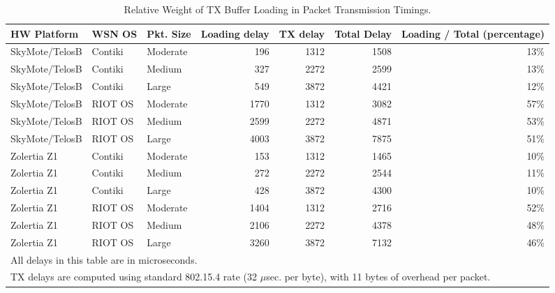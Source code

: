 \documentclass[10pt,emptycopyrightspace]{ewsn-proc}
\begin{document}
\begin{table*}[htbp]
\caption{Relative Weight of TX Buffer Loading in Packet Transmission Timings.}
\label{TblTXRelWeight}
\centering

\begin{tabular}{l|l|l|r|r|r|r}
\hline
HW Platform & WSN OS  & Pkt. Size
                  & Loading delay & TX delay & Total Delay
                  & Loading / Total (percentage) \\
\hline
SkyMote/TelosB    & Contiki & Moderate
                  &   196      & 1312     & 1508
                  & 13\% \\
SkyMote/TelosB    & Contiki & Medium
                  &   327      & 2272     & 2599
                  & 13\% \\
SkyMote/TelosB    & Contiki & Large
                  &   549      & 3872     & 4421
                  & 12\% \\
\hline
SkyMote/TelosB    & RIOT OS & Moderate
                  &  1770      & 1312     & 3082
                  & 57\% \\
SkyMote/TelosB    & RIOT OS & Medium
                  &  2599      & 2272     & 4871
                  & 53\% \\
SkyMote/TelosB    & RIOT OS & Large
                  &  4003      & 3872     & 7875
                  & 51\% \\
\hline
Zolertia Z1       & Contiki & Moderate
                  &   153      & 1312     & 1465
                  & 10\% \\
Zolertia Z1       & Contiki & Medium
                  &   272      & 2272     & 2544
                  & 11\% \\
Zolertia Z1       & Contiki & Large
                  &   428      & 3872     & 4300
                  & 10\% \\
\hline
Zolertia Z1       & RIOT OS & Moderate
                  &  1404      & 1312     & 2716
                  & 52\% \\
Zolertia Z1       & RIOT OS & Medium
                  &  2106   & 2272        & 4378
                  & 48\% \\
Zolertia Z1       & RIOT OS & Large
                  &  3260   & 3872        & 7132
                  & 46\% \\
\hline
\multicolumn{7}{l}{All delays in this table are in microseconds.}\\
\multicolumn{7}{l}{TX delays are computed using standard 802.15.4 rate
(32 $\mu$sec. per byte), with 11 bytes of overhead per packet.}\\
\end{tabular}
\end{table*}
\end{document}
